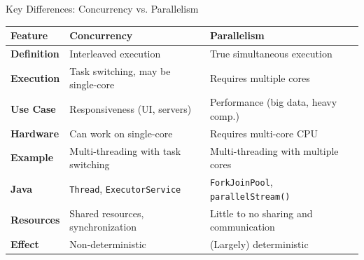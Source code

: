 \documentclass[xcolor={dvipsnames,svgnames},aspectratio=169]{beamer}
\begin{document}
\begin{frame}{Key Differences: Concurrency vs. Parallelism}
  \vspace{-0.4cm}
\begin{table}[]
    \centering
    \begin{tabular}{l|l|l}
        \toprule
      \textbf{Feature}
      & \textbf{Concurrency}
      & \textbf{Parallelism} \\
        \midrule
      \textbf{Definition}
      & Interleaved execution
      & True simultaneous execution\\
        \midrule
      \textbf{Execution}
      & Task switching, may be single-core
      & Requires multiple cores \\
        \midrule
      \textbf{Use Case}
      & Responsiveness (UI, servers)
      & Performance (big data, heavy comp.) \\
        \midrule
      \textbf{Hardware}
      & Can work on single-core
      & Requires multi-core CPU \\
        \midrule
      \textbf{Example}
      & Multi-threading with task switching
      & Multi-threading with multiple cores \\
        \midrule
      \textbf{Java}
      & \texttt{Thread}, \texttt{ExecutorService}
      & \texttt{ForkJoinPool}, \texttt{parallelStream()} \\
      \midrule
      \textbf{Resources}
      & Shared resources, synchronization
      & Little to no sharing and communication\\
      \midrule
      \textbf{Effect}
      & Non-deterministic
      & (Largely) deterministic\\
        \bottomrule
    \end{tabular}
  \end{table}
\end{frame}
\end{document}
